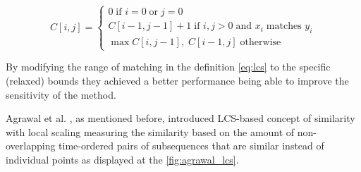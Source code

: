 \begin{equation}
 C[i,j] = 
 \begin{cases} 
  0 \; \text{if } i=0 \; \text{or} \; j=0 \\
  C[i-1,j-1]+1 \; \text{if } i,j>0 \; \text{and } x_{i} \; \text{matches } y_{i} \\
  \max{C[i,j-1], \;C[i-1,j]} \; \text{otherwise}
 \end{cases}
\label{eq:lcs}
\end{equation}

By modifying the range of matching in the definition \ref{eq:lcs} to the specific (relaxed) bounds they achieved a better performance being able to improve the sensitivity of the method. 

Agrawal et al. \cite{citeulike:3816327}, as mentioned before, introduced LCS-based concept of similarity with local scaling measuring the similarity based on the amount of non-overlapping time-ordered pairs of subsequences that are similar instead of individual points as displayed at the \ref{fig:agrawal_lcs}.